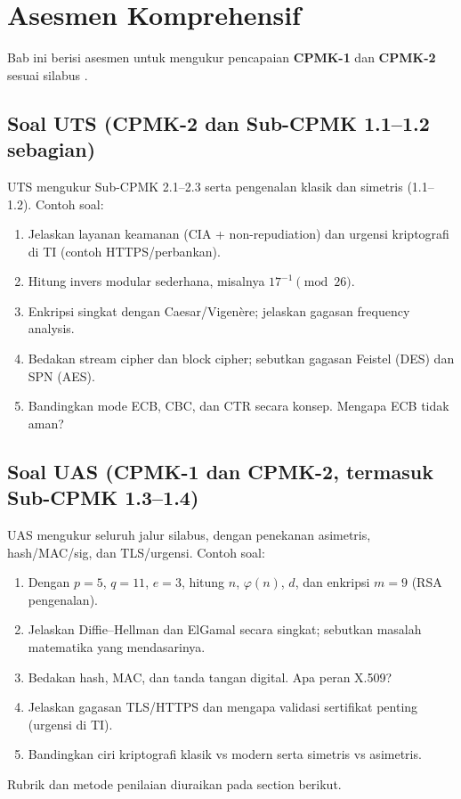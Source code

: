 ﻿\section{Asesmen Komprehensif}

Bab ini berisi asesmen untuk mengukur pencapaian \textbf{CPMK-1} dan \textbf{CPMK-2} sesuai silabus \cite{stallings2017,munir2019}.

\subsection{Soal UTS (CPMK-2 dan Sub-CPMK 1.1--1.2 sebagian)}

UTS mengukur Sub-CPMK 2.1--2.3 serta pengenalan klasik dan simetris (1.1--1.2). Contoh soal:
\begin{enumerate}
  \item Jelaskan layanan keamanan (CIA + non-repudiation) dan urgensi kriptografi di TI (contoh HTTPS/perbankan).
  \item Hitung invers modular sederhana, misalnya $17^{-1} \pmod{26}$.
  \item Enkripsi singkat dengan Caesar/Vigen\`{e}re; jelaskan gagasan frequency analysis.
  \item Bedakan stream cipher dan block cipher; sebutkan gagasan Feistel (DES) dan SPN (AES).
  \item Bandingkan mode ECB, CBC, dan CTR secara konsep. Mengapa ECB tidak aman?
\end{enumerate}

\subsection{Soal UAS (CPMK-1 dan CPMK-2, termasuk Sub-CPMK 1.3--1.4)}

UAS mengukur seluruh jalur silabus, dengan penekanan asimetris, hash/MAC/sig, dan TLS/urgensi. Contoh soal:
\begin{enumerate}
  \item Dengan $p=5$, $q=11$, $e=3$, hitung $n$, $\varphi(n)$, $d$, dan enkripsi $m=9$ (RSA pengenalan).
  \item Jelaskan Diffie--Hellman dan ElGamal secara singkat; sebutkan masalah matematika yang mendasarinya.
  \item Bedakan hash, MAC, dan tanda tangan digital. Apa peran X.509?
  \item Jelaskan gagasan TLS/HTTPS dan mengapa validasi sertifikat penting (urgensi di TI).
  \item Bandingkan ciri kriptografi klasik vs modern serta simetris vs asimetris.
\end{enumerate}

Rubrik dan metode penilaian diuraikan pada section berikut.


